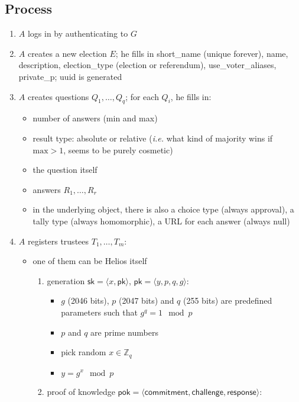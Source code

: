 \documentclass[a4paper]{article}
\newcommand{\Z}{\mathbb{Z}}
\begin{document}
\subsection{Process}
\begin{enumerate}
\item $A$ logs in by authenticating to $G$
\item $A$ creates a new election $E$; he fills in \textsf{short\_name}
  (unique forever), \textsf{name}, \textsf{description},
  \textsf{election\_type} (\textsf{election} or \textsf{referendum}),
  \textsf{use\_voter\_aliases}, \textsf{private\_p}; \textsf{uuid} is
  generated
\item $A$ creates questions $Q_1,\dots,Q_q$; for each $Q_i$, he fills in:
  \begin{itemize}
  \item number of answers (min and max)
  \item result type: absolute or relative (\emph{i.e.} what kind of
    majority wins if $\textrm{max}>1$, seems to be purely cosmetic)
  \item the question itself
  \item answers $R_1,\dots,R_r$
  \item in the underlying object, there is also a choice type (always
    approval), a tally type (always homomorphic), a URL for each answer (always null)
  \end{itemize}
\item $A$ registers trustees $T_1,\dots,T_m$:
  \begin{itemize}
  \item one of them can be Helios itself
    \begin{enumerate}
      \item generation $\textsf{sk}=\langle x,\textsf{pk}\rangle$, $\textsf{pk}=\langle y,p,q,g\rangle$:
        \begin{itemize}
        \item $g$ (2046 bits), $p$ (2047 bits) and $q$ (255 bits) are
          predefined parameters such that $g^q=1\mod p$
        \item $p$ and $q$ are prime numbers
        \item pick random $x\in \Z_q$
        \item $y=g^x \mod p$
        \end{itemize}
      \item proof of knowledge $\textsf{pok}=\langle\textsf{commitment},\textsf{challenge},\textsf{response}\rangle$:
        \begin{itemize}

\end{itemize}
\end{enumerate}
\end{itemize}
\end{enumerate}
\end{document}
